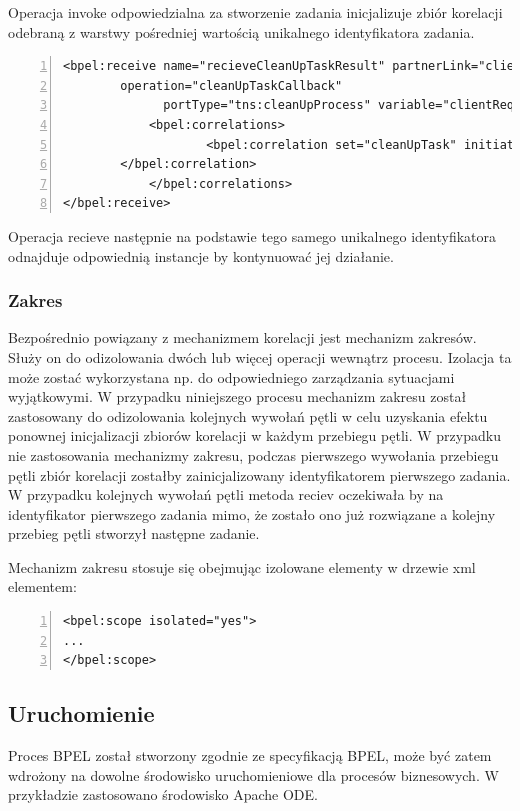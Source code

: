 Operacja invoke odpowiedzialna za stworzenie zadania inicjalizuje zbiór korelacji odebraną z warstwy pośredniej wartością unikalnego identyfikatora zadania.

\begin{lstlisting}[caption=Wykorzystanie zbiorów korelacji w aktywności receive.,numbers=left]
<bpel:receive name="recieveCleanUpTaskResult" partnerLink="client" 
		operation="cleanUpTaskCallback"
	          portType="tns:cleanUpProcess" variable="clientRequest">
            <bpel:correlations>
                	<bpel:correlation set="cleanUpTask" initiate="no">
		</bpel:correlation>    
            </bpel:correlations>
</bpel:receive>

\end{lstlisting}

 Operacja recieve następnie na podstawie tego samego unikalnego identyfikatora odnajduje odpowiednią instancje by kontynuować jej działanie. 

\subsubsection{Zakres }
Bezpośrednio powiązany z mechanizmem korelacji jest mechanizm zakresów. Służy on do odizolowania dwóch lub więcej operacji wewnątrz procesu. Izolacja ta może zostać wykorzystana np. do odpowiedniego zarządzania sytuacjami wyjątkowymi. W przypadku niniejszego procesu mechanizm zakresu został zastosowany do odizolowania kolejnych wywołań pętli w celu uzyskania efektu ponownej inicjalizacji zbiorów korelacji w każdym przebiegu pętli. W przypadku nie zastosowania mechanizmy zakresu, podczas pierwszego wywołania przebiegu pętli zbiór korelacji zostałby zainicjalizowany identyfikatorem pierwszego zadania. W przypadku kolejnych wywołań pętli metoda reciev oczekiwała by na identyfikator pierwszego zadania mimo, że zostało ono już rozwiązane a kolejny przebieg pętli stworzył następne zadanie. 

Mechanizm zakresu stosuje się obejmując izolowane elementy w drzewie xml elementem: 

\begin{lstlisting}[caption=Przykład zastosowania zakresu w BPEL.,numbers=left]
<bpel:scope isolated="yes">
...
</bpel:scope>
\end{lstlisting}

\subsection{Uruchomienie}
 Proces BPEL został stworzony zgodnie ze specyfikacją BPEL, może być zatem wdrożony na dowolne środowisko uruchomieniowe dla procesów biznesowych. W przykładzie zastosowano środowisko Apache ODE. 

